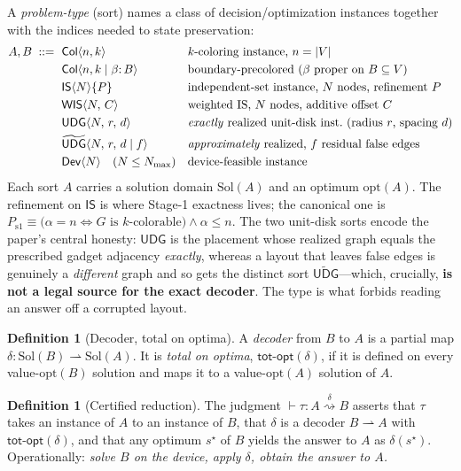 \documentclass[11pt]{article}
\theoremstyle{definition}
\newtheorem{definition}[theorem]{Definition}
\theoremstyle{remark}
\newcommand{\indep}{\alpha}
\newcommand{\tCol}{\mathsf{Col}}
\newcommand{\tIS}{\mathsf{IS}}
\newcommand{\tWIS}{\mathsf{WIS}}
\newcommand{\tUDG}{\mathsf{UDG}}
\newcommand{\tUDGa}{\widetilde{\mathsf{UDG}}}
\newcommand{\tDev}{\mathsf{Dev}}
\newcommand{\Sol}{\mathrm{Sol}}
\newcommand{\Nmax}{N_{\max}}
\newcommand{\totopt}{\mathsf{tot\text{-}opt}}
\newcommand{\redto}[1]{\mathrel{\overset{\textstyle #1}{\rightsquigarrow}}}
\begin{document}
A \emph{problem-type} (sort) names a class of decision/optimization instances
together with the indices needed to state preservation:
\begin{align*}
A,B \;::=\;
&\ \tCol\langle n,k\rangle                       && \text{$k$-coloring instance, $n=|V|$}\\
&\ \tCol\langle n,k \mid \beta{:}\,B\rangle       && \text{boundary-precolored ($\beta$ proper on $B\subseteq V$)}\\
&\ \tIS\langle N\rangle\{P\}                      && \text{independent-set instance, $N$ nodes, refinement $P$}\\
&\ \tWIS\langle N,\,C\rangle                       && \text{weighted IS, $N$ nodes, additive offset $C$}\\
&\ \tUDG\langle N,\,r,\,d\rangle                   && \text{\emph{exactly} realized unit-disk inst.\ (radius $r$, spacing $d$)}\\
&\ \tUDGa\langle N,\,r,\,d \mid f\rangle           && \text{\emph{approximately} realized, $f$ residual false edges}\\
&\ \tDev\langle N\rangle \quad (N\le \Nmax)        && \text{device-feasible instance}
\end{align*}
Each sort $A$ carries a solution domain $\Sol(A)$ and an optimum
$\mathrm{opt}(A)$. The refinement on $\tIS$ is where Stage-1 exactness lives; the
canonical one is
$P_{\mathrm{s1}} \equiv \bigl(\indep = n \iff G \text{ is } k\text{-colorable}\bigr)\wedge \indep\le n$.
The two unit-disk sorts encode the paper's central honesty: $\tUDG$ is the
placement whose realized graph equals the prescribed gadget adjacency
\emph{exactly}, whereas a layout that leaves false edges is genuinely a
\emph{different} graph and so gets the distinct sort $\tUDGa$---which, crucially,
\textbf{is not a legal source for the exact decoder}. The type is what forbids
reading an answer off a corrupted layout.

\begin{definition}[Decoder, total on optima]
A \emph{decoder} from $B$ to $A$ is a partial map
$\delta:\Sol(B)\rightharpoonup\Sol(A)$. It is \emph{total on optima},
$\totopt(\delta)$, if it is defined on every value-$\mathrm{opt}(B)$ solution and
maps it to a value-$\mathrm{opt}(A)$ solution of $A$.
\end{definition}

\begin{definition}[Certified reduction]
The judgment $\vdash \tau : A \redto{\delta} B$ asserts that $\tau$ takes an
instance of $A$ to an instance of $B$, that $\delta$ is a decoder
$B\!\rightharpoonup\!A$ with $\totopt(\delta)$, and that any optimum $s^\star$ of
$B$ yields the answer to $A$ as $\delta(s^\star)$. Operationally: \emph{solve $B$
on the device, apply $\delta$, obtain the answer to $A$.}
\end{definition}
\end{document}
